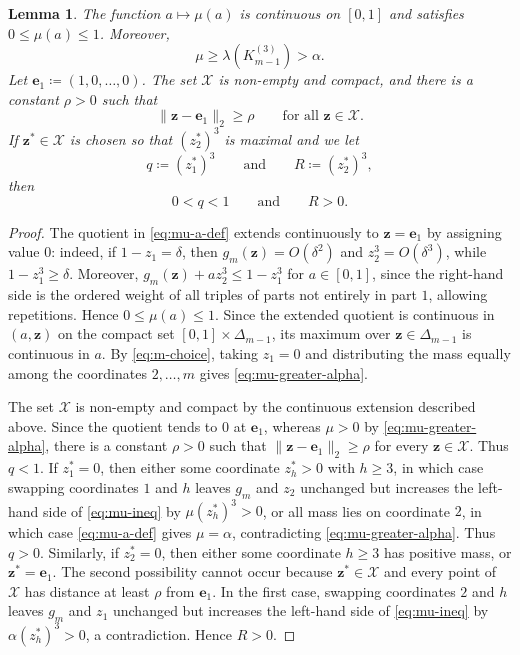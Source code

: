 \documentclass[10pt]{article}
\numberwithin{equation}{section}
\newtheorem{lemma}[theorem]{Lemma}
\begin{document}
\begin{lemma}\label{lem:mu-basic}
The function $a\mapsto \mu(a)$ is continuous on $[0,1]$ and satisfies $0\le \mu(a)\le 1$. Moreover,
\begin{equation}
        \mu\ge \lambda(K_{m-1}^{(3)})>\alpha .
        \label{eq:mu-greater-alpha}
\end{equation}
Let $\mathbf{e}_1 \coloneqq (1,0,\ldots,0)$. The set $\mathcal X$ is non-empty and compact, and there is a constant $\rho>0$ such that
\[
        \|\mathbf{z}-\mathbf{e}_1\|_2\ge \rho \qquad\text{for all } \mathbf{z}\in\mathcal X.
\]
If $\mathbf{z}^*\in\mathcal X$ is chosen so that $(z_2^*)^3$ is maximal
and we let
\begin{equation}
        q\coloneqq (z_1^*)^3\qquad\text{and}\qquad  R\coloneqq (z_2^*)^3,
        \label{eq:qR-def}
\end{equation}
then
\begin{equation}
        0<q<1 \qquad\text{and}\qquad R>0.
        \label{eq:qR-positive}
\end{equation}
\end{lemma}

\begin{proof}
The quotient in \eqref{eq:mu-a-def} extends continuously to $\mathbf{z}=\mathbf{e}_1$ by assigning value $0$: indeed, if $1-z_1=\delta$, then $g_m(\mathbf{z})=O(\delta^2)$ and $z_2^3=O(\delta^3)$, while $1-z_1^3\ge \delta$. Moreover, $g_m(\mathbf{z})+a z_2^3\le 1-z_1^3$ for $a\in[0,1]$, since the right-hand side is the ordered weight of all triples of parts not entirely in part $1$, allowing repetitions. Hence $0\le \mu(a)\le 1$. Since the extended quotient is continuous in $(a,\mathbf{z})$ on the compact set $[0,1]\times\Delta_{m-1}$, its maximum over $\mathbf{z}\in\Delta_{m-1}$ is continuous in $a$. 
By \eqref{eq:m-choice}, taking $z_1=0$ and distributing the mass equally among the coordinates $2,\ldots,m$ gives \eqref{eq:mu-greater-alpha}. 

The set $\mathcal X$ is non-empty and compact by the continuous extension described above. Since the quotient tends to $0$ at $\mathbf{e}_1$, whereas $\mu>0$ by \eqref{eq:mu-greater-alpha}, there is a constant $\rho>0$ such that $\|\mathbf{z}-\mathbf{e}_1\|_2\ge\rho$ for every $\mathbf{z}\in\mathcal X$. Thus $q<1$. If $z^*_1=0$, then either some coordinate $z^*_h>0$ with $h\ge 3$, in which case swapping coordinates $1$ and $h$ leaves $g_m$ and $z_2$ unchanged but increases the left-hand side of \eqref{eq:mu-ineq} by $\mu (z_h^*)^3>0$, or all mass lies on coordinate $2$, in which case \eqref{eq:mu-a-def} gives $\mu=\alpha$, contradicting \eqref{eq:mu-greater-alpha}. Thus $q>0$. Similarly, if $z^*_2=0$, then either some coordinate $h\ge 3$ has positive mass, or $\mathbf{z}^*=\mathbf{e}_1$. The second possibility cannot occur because $\mathbf{z}^*\in\mathcal X$ and every point of $\mathcal X$ has distance at least $\rho$ from $\mathbf{e}_1$. In the first case, swapping coordinates $2$ and $h$ leaves $g_m$ and $z_1$ unchanged but increases the left-hand side of \eqref{eq:mu-ineq} by $\alpha (z_h^*)^3>0$, a contradiction. Hence $R>0$.
\end{proof}
\end{document}
